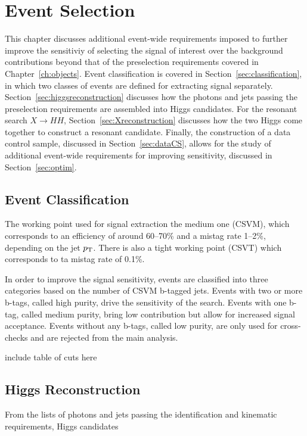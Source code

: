 \chapter{Event Selection\label{ch:selection}}

This chapter discusses additional event-wide requirements imposed to further
improve the sensitiviy of selecting the signal of interest over the background contributions
beyond that of the preselection requirements covered in Chapter~\ref{ch:objects}.
Event classification is covered in Section~\ref{sec:classification}, in which two classes of
events are defined for extracting signal separately.
Section~\ref{sec:higgsreconstruction} discusses how the photons and jets passing the preselection
requirements are assembled into Higgs candidates. For the resonant search $X\rightarrow HH$,
Section~\ref{sec:Xreconstruction} discusses how the two Higgs come together to construct a resonant
candidate. Finally, the construction of a data control
sample, discussed in Section~\ref{sec:dataCS}, allows for the study of additional event-wide
requirements for improving sensitivity, discussed in Section~\ref{sec:optim}.

\section{Event Classification\label{sec:classification}}

The working point used for signal extraction the medium one (CSVM),
which corresponds to an efficiency of around 60--70\%
and a mistag rate 1--2\%, depending on the jet $p_{\rm T}$.
There is also a tight working point (CSVT) which corresponds to ta mistag rate of 0.1\%.

In order to improve the signal sensitivity, events are classified into three categories
based on the number of CSVM b-tagged jets. Events with two or more b-tags, called high purity,
drive the sensitivity of the search. Events with one b-tag, called medium purity,
bring low contribution but allow for increased signal acceptance. Events without any b-tags,
called low purity, are only used for cross-checks and are rejected from the main analysis.

include table of cuts here

\section{Higgs Reconstruction\label{sec:higgsreconstruction}}

From the lists of photons and jets passing the identification and kinematic requirements, Higgs
candidates 


